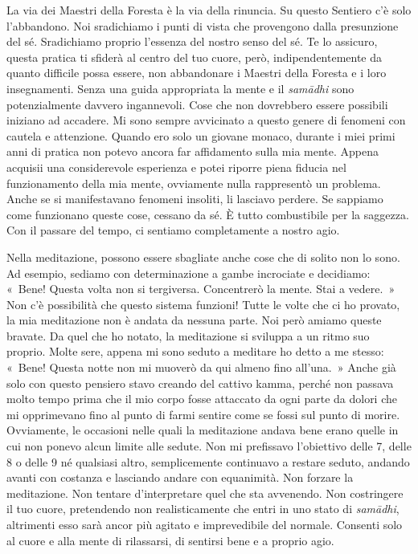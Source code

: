 La via dei Maestri della Foresta è la via della rinuncia. Su questo
Sentiero c'è solo l'abbandono. Noi sradichiamo i punti di vista che
provengono dalla presunzione del sé. Sradichiamo proprio l'essenza del
nostro senso del sé. Te lo assicuro, questa pratica ti sfiderà al centro
del tuo cuore, però, indipendentemente da quanto difficile possa essere,
non abbandonare i Maestri della Foresta e i loro insegnamenti. Senza una
guida appropriata la mente e il \emph{samādhi} sono potenzialmente
davvero ingannevoli. Cose che non dovrebbero essere possibili iniziano
ad accadere. Mi sono sempre avvicinato a questo genere di fenomeni con
cautela e attenzione. Quando ero solo un giovane monaco, durante i miei
primi anni di pratica non potevo ancora far affidamento sulla mia mente.
Appena acquisii una considerevole esperienza e potei riporre piena
fiducia nel funzionamento della mia mente, ovviamente nulla rappresentò
un problema. Anche se si manifestavano fenomeni insoliti, li lasciavo
perdere. Se sappiamo come funzionano queste cose, cessano da sé. È tutto
combustibile per la saggezza. Con il passare del tempo, ci sentiamo
completamente a nostro agio.

Nella meditazione, possono essere sbagliate anche cose che di solito non
lo sono. Ad esempio, sediamo con determinazione a gambe incrociate e
decidiamo: «~Bene! Questa volta non si tergiversa. Concentrerò la mente.
Stai a vedere.~» Non c'è possibilità che questo sistema funzioni! Tutte
le volte che ci ho provato, la mia meditazione non è andata da nessuna
parte. Noi però amiamo queste bravate. Da quel che ho notato, la
meditazione si sviluppa a un ritmo suo proprio. Molte sere, appena mi
sono seduto a meditare ho detto a me stesso: «~Bene! Questa notte non mi
muoverò da qui almeno fino all'una.~» Anche già solo con questo pensiero
stavo creando del cattivo kamma, perché non passava molto tempo
prima che il mio corpo fosse attaccato da ogni parte da dolori che mi
opprimevano fino al punto di farmi sentire come se fossi sul punto di
morire. Ovviamente, le occasioni nelle quali la meditazione andava bene
erano quelle in cui non ponevo alcun limite alle sedute. Non mi
prefissavo l'obiettivo delle 7, delle 8 o delle 9 né qualsiasi altro,
semplicemente continuavo a restare seduto, andando avanti con costanza e
lasciando andare con equanimità. Non forzare la meditazione. Non tentare
d'interpretare quel che sta avvenendo. Non costringere il tuo cuore,
pretendendo non realisticamente che entri in uno stato di
\emph{samādhi}, altrimenti esso sarà ancor più agitato e imprevedibile
del normale. Consenti solo al cuore e alla mente di rilassarsi, di
sentirsi bene e a proprio agio.

